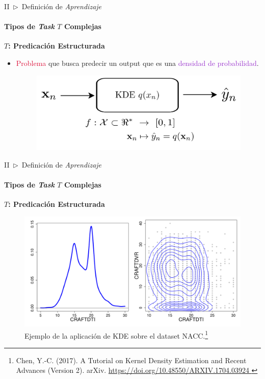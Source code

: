 \documentclass[xcolor=dvipsnames]{beamer}
\begin{document}
    \begin{frame}{II~$\rhd$~Definición de \textit{Aprendizaje}}
    \framesubtitle{Tipos de \textit{Task} \( T \) Complejas}
        \textbf{\Large{\( T \): Predicación Estructurada}}
        \vspace{2mm}
        \begin{itemize}
            \item \textcolor{crimson}{Problema} que busca predecir un output que es una \textcolor{DarkOrchid}{densidad de probabilidad}.
            \vspace{1mm}
            \begin{figure}
                \centering
                \includegraphics[width=0.9\linewidth]{imgs/def01/task09.png}
            \end{figure}
        \end{itemize}
    \end{frame}

    \begin{frame}{II~$\rhd$~Definición de \textit{Aprendizaje}}
    \framesubtitle{Tipos de \textit{Task} \( T \) Complejas}
        \textbf{\Large{\( T \): Predicación Estructurada}}
        \vspace{2mm}
        \begin{figure}
            \centering
            \includegraphics[width=0.7\linewidth]{imgs/def01/chen2017tutorialkerneldensityestimation-img01.png}
            \caption{Ejemplo de la aplicación de KDE sobre el dataset NACC.\footnote{\tiny{Chen, Y.-C. (2017). A Tutorial on Kernel Density Estimation and Recent Advances (Version 2). arXiv. \url{https://doi.org/10.48550/ARXIV.1704.03924 }}}}
        \end{figure}
    \end{frame}
\end{document}

